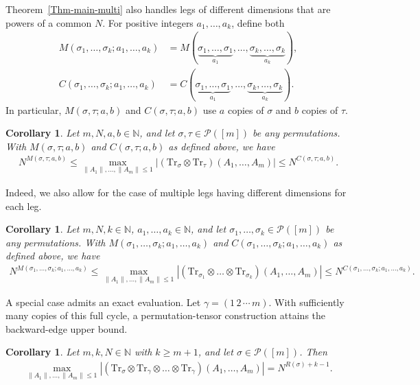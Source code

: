 \documentclass[12pt]{article}
\numberwithin{equation}{section}
\theoremstyle{plain}
\newtheorem{corollary}[theorem]{Corollary}
\def\bN{\mathbb N}
\def\cP{\mathcal P}
\def\Tr{\mathrm {Tr}}
\begin{document}
Theorem~\ref{Thm-main-multi} also handles legs of different dimensions that are powers of a common $N$. For positive integers $a_1,\ldots,a_k$, define both
\[
\begin{split}
M(\sigma_1,\ldots,\sigma_k;a_1,\ldots,a_k)
&=M(\underbrace{\sigma_1,\ldots,\sigma_1}_{a_1},\ldots,
     \underbrace{\sigma_k,\ldots,\sigma_k}_{a_k}),\\
C(\sigma_1,\ldots,\sigma_k;a_1,\ldots,a_k)
&=C(\underbrace{\sigma_1,\ldots,\sigma_1}_{a_1},\ldots,
     \underbrace{\sigma_k,\ldots,\sigma_k}_{a_k}).
\end{split}
\]
In particular, $M(\sigma,\tau;a,b)$ and $C(\sigma,\tau;a,b)$ use $a$ copies of $\sigma$ and $b$ copies of $\tau$.

\begin{corollary} \label{Coro-main-multi-2 leg}
Let $m,N,a,b \in \bN$, and let $\sigma,\tau \in \cP([m])$ be any permutations. With $M(\sigma,\tau;a,b)$ and $C(\sigma,\tau;a,b)$ as defined above, we have
\begin{align*}
    N^{M(\sigma,\tau;a,b)} \le
    \max_{\|A_1\|,\ldots,\|A_m\| \le 1} \left| \left( \Tr_{\sigma} \otimes \Tr_{\tau} \right) \left( A_1, \ldots, A_m \right) \right|
    \le N^{C(\sigma,\tau;a,b)}.
\end{align*}
\end{corollary}

Indeed, we also allow for the case of multiple legs having different dimensions for each leg.

\begin{corollary} \label{Coro-main-multi leg}
Let $m,N,k \in \bN$, $a_1,\ldots,a_k \in \bN$, and let $\sigma_1, \ldots,\sigma_k \in \cP([m])$ be any permutations. With $M(\sigma_1,\ldots,\sigma_k;a_1,\ldots,a_k)$ and $C(\sigma_1,\ldots,\sigma_k;a_1,\ldots,a_k)$ as defined above, we have
\begin{align*}
    N^{M(\sigma_1, \ldots,\sigma_k;a_1,\ldots,a_k)} \le
    \max_{\|A_1\|,\ldots,\|A_m\| \le 1} \left| \left( \Tr_{\sigma_1} \otimes \ldots \otimes \Tr_{\sigma_k} \right) \left( A_1, \ldots, A_m \right) \right|
    \le N^{C(\sigma_1, \ldots,\sigma_k;a_1,\ldots,a_k)}.
\end{align*}
\end{corollary}

A special case admits an exact evaluation. Let $\gamma=(1\,2\,\cdots\,m)$. With sufficiently many copies of this full cycle, a permutation-tensor construction attains the backward-edge upper bound.

\begin{corollary} \label{Coro-multi-backward}
Let $m,k,N\in\bN$ with $k\ge m+1$, and let $\sigma\in\cP([m])$. Then
\begin{align*}
    \max_{\|A_1\|,\ldots,\|A_m\| \le 1} \left| \left( \Tr_{\sigma} \otimes \Tr_{\gamma} \otimes \ldots \otimes \Tr_{\gamma} \right) \left( A_1, \ldots, A_m \right) \right|
    = N^{R(\sigma)+k-1}.
\end{align*}
\end{corollary}
\end{document}
